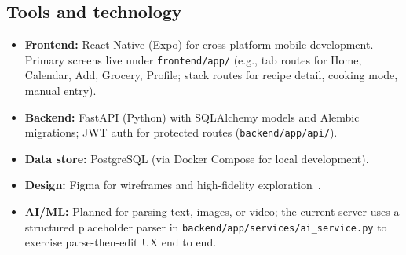 \subsection{Tools and technology}
\begin{itemize}[leftmargin=*]
  \item \textbf{Frontend:} React Native (Expo) for cross-platform mobile development. Primary screens live under \texttt{frontend/app/} (e.g., tab routes for Home, Calendar, Add, Grocery, Profile; stack routes for recipe detail, cooking mode, manual entry).
  \item \textbf{Backend:} FastAPI (Python) with SQLAlchemy models and Alembic migrations; JWT auth for protected routes (\texttt{backend/app/api/}).
  \item \textbf{Data store:} PostgreSQL (via Docker Compose for local development).
  \item \textbf{Design:} Figma for wireframes and high-fidelity exploration~\cite{figma2026help}.
  \item \textbf{AI/ML:} Planned for parsing text, images, or video; the current server uses a structured placeholder parser in \texttt{backend/app/services/ai\_service.py} to exercise parse-then-edit UX end to end.
\end{itemize}
